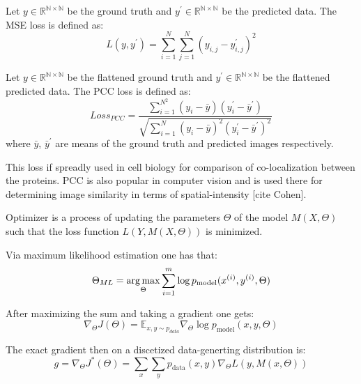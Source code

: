 \begin{definition}
	Let $y \in \mathbb{R^{N \times N}}$ be the ground truth and $y^\prime \in \mathbb{R^{N \times N}}$ be the predicted data. The MSE loss is defined as:
	\begin{equation}
		L(y, y^\prime) = \sum_{i=1}^{N} \sum_{j=1}^{N} (y_{i, j} - y_{i, j}^\prime)^2
	\end{equation}
\end{definition}

\begin{definition}
	Let $y \in \mathbb{R^{N \times N}}$ be the flattened ground truth and $y^\prime \in \mathbb{R^{N \times N}}$ be the flattened predicted data. The PCC loss is defined as:
	\begin{equation}
		Loss_{PCC} = \frac{\sum_{i=1}^{N^2}{(y_i - \bar{y})(y_i^\prime - \bar{y}^\prime)}}{\sqrt{\sum_{i=1}^{N}{(y_i - \bar{y})^2(y_i^\prime - \bar{y}^\prime)^2}}}   
	\end{equation}
	where $\bar{y}$, $\bar{y}^\prime$ are means of the ground truth and predicted images respectively.
	
	This loss if spreadly used in cell biology for comparison of co-localization between the proteins. PCC is also popular in computer vision and is used there for determining image similarity in terms of spatial-intensity [cite Cohen].
\end{definition}

\begin{definition}[Optimization]
	Optimizer is a process of updating the parameters $\Theta$ of the model $M(X, \Theta)$ such that the loss function $L(Y, M(X, \Theta))$ is minimized.
\end{definition}

Via maximum likelihood estimation one has that:
\begin{equation}
	\Theta_{ML} = \operatorname*{arg\,max}\limits_{\Theta} \sum_{i=1}^{m} \log{p_{\text{model}}(x^{(i)}, y^{(i)}, \Theta)}
\end{equation}

After maximizing the sum and taking a gradient one gets:
\begin{equation}
	\nabla_{\Theta} J(\Theta) = \mathbb{E}_{x, y \sim p_{data}} \nabla_{\Theta} \log{p_{\text{model}}(x, y, \Theta)}
\end{equation}

The exact gradient then on a discetized data-generting distribution is:
\begin{equation}
	g = \nabla_{\Theta} J^*(\Theta) = \sum_{x} \sum_{y}{p_{\text{data}}(x, y) \nabla_{\Theta} L(y, M(x, \Theta))}
\end{equation}

